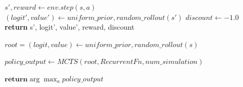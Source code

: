 \documentclass[aspectratio=169,xcolor=dvipsnames]{beamer}
\begin{document}
\begin{frame}{}
  \begin{algorithmic}
      \State $s', reward \gets env.step(s, a)$
      \State $(logit', value')\gets uniform\_prior, random\_rollout(s')$
      \State $discount \gets -1.0 $
      \State \textbf{return} s', logit', value', reward, discount
    \EndFunction
  \end{algorithmic}

    \medskip
    \medskip
  \begin{algorithmic}
      \State $root = (logit, value)\gets uniform\_prior, random\_rollout(s)$


      \State $policy\_output \gets MCTS(root, RecurrentFn, num\_simulation)$

      \State $\textbf{return} \arg\max_a policy\_output$

      \EndFunction
  \end{algorithmic}
\end{frame}

\end{document}
